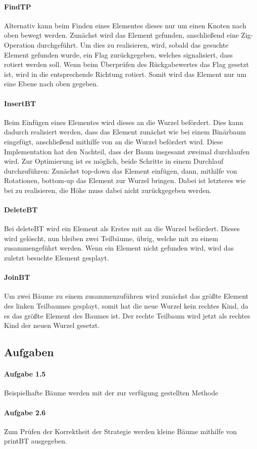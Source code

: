 \paragraph{FindTP}
Alternativ kann beim Finden eines Elementes dieses nur um einen Knoten nach oben bewegt werden.
Zunächst wird das Element gefunden, anschließend eine Zig-Operation durchgeführt.
Um dies zu realisieren, wird, sobald das gesuchte Element gefunden wurde, ein Flag zurückgegeben,
welches signalisiert, dass rotiert werden soll.
Wenn beim Überprüfen des Rückgabewertes das Flag gesetzt ist, wird in die entsprechende Richtung
rotiert.
Somit wird das Element nur um eine Ebene nach oben gegeben.

\paragraph{InsertBT}
Beim Einfügen eines Elementes wird dieses an die Wurzel befördert.
Dies kann dadurch realisiert werden, dass das Element zunächst wie bei einem Binärbaum
eingefügt, anschließend mithilfe von  an die Wurzel befördert wird.
Diese Implementation hat den Nachteil, dass der Baum insgesamt zweimal durchlaufen wird.
Zur Optimierung ist es möglich, beide Schritte in einem Durchlauf durchzuführen: Zunächst top-down
das Element einfügen, dann, mithilfe von Rotationen, bottom-up das Element zur Wurzel bringen.
Dabei ist letzteres wie bei  zu realisieren,
die Höhe muss dabei nicht zurückgegeben werden.

\paragraph{DeleteBT}
Bei deleteBT wird ein Element als Erstes mit  an die Wurzel befördert.
Dieses wird gelöscht, nun bleiben zwei Teilbäume, übrig, welche mit  zu einem
zusammengeführt werden.
Wenn ein Element nicht gefunden wird, wird das zuletzt besuchte Element gesplayt.

\paragraph{JoinBT}\label{par:joinbt}
Um zwei Bäume zu einem zusammenzuführen wird zunächst das größte Element des linken Teilbaumes
gesplayt, somit hat die neue Wurzel kein rechtes Kind, da es das größte Element des Baumes ist.
Der rechte Teilbaum wird jetzt als rechtes Kind der neuen Wurzel gesetzt.

\subsection{Aufgaben}\label{subsec:aufgaben2}

\paragraph{Aufgabe 1.5}
Beispielhafte Bäume werden mit der zur verfügung gestellten Methode\\

\paragraph{Aufgabe 2.6} Zum Prüfen der Korrektheit der Strategie werden kleine Bäume mithilfe von
printBT ausgegeben.
